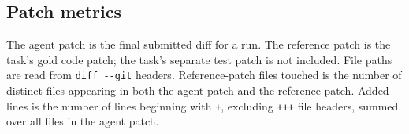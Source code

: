 \subsection{Patch metrics}
\label{app:patches}

The agent patch is the final submitted diff for a run. The reference patch is the task's gold code patch; the task's separate test patch is not included. File paths are read from \verb!diff --git! headers. Reference-patch files touched is the number of distinct files appearing in both the agent patch and the reference patch. Added lines is the number of lines beginning with \verb!+!, excluding \verb!+++! file headers, summed over all files in the agent patch.

